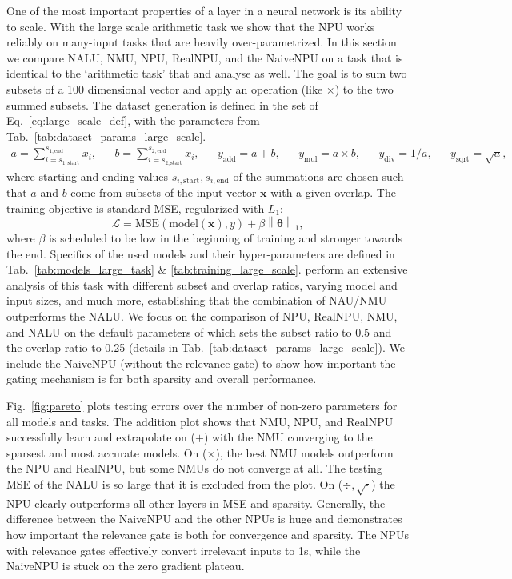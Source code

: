 \documentclass[9pt]{article}
\newcommand{\norm}[1]{\left\lVert #1 \right\rVert}
\begin{document}
One of the most important properties of a layer in a neural network is its
ability to scale. With the large scale arithmetic task we show that the NPU
works reliably on many-input tasks that are heavily over-parametrized.  In this
section we compare NALU, NMU, NPU, RealNPU, and the NaiveNPU on a task that is identical
to the `arithmetic task' that \cite{madsen_neural_2020} and
\cite{trask_neural_2018} analyse as well.
The goal is to sum two subsets of a 100 dimensional vector and
apply an operation (like $\times$) to the two summed subsets.  The dataset
generation is defined in the set of Eq.~\ref{eq:large_scale_def}, with the
parameters from Tab.~\ref{tab:dataset_params_large_scale}.
\begin{align}
  \label{eq:large_scale_def}
  a = \sum_{i=s_{1,\text{start}}}^{s_{1,\text{end}}} x_i, &&
  b = \sum_{i=s_{2,\text{start}}}^{s_{2,\text{end}}} x_i, &&
  y_{\text{add}} = a + b, && y_{\text{mul}} = a \times b, &&
  y_{\text{div}} = 1 / a, && y_{\text{sqrt}} = \sqrt{a},
\end{align}
where starting and ending values $s_{i,\text{start}},s_{i,\text{end}}$ of the
summations are chosen such that $a$ and $b$ come from subsets of the input
vector $\bm x$ with a given overlap.  The training objective is standard MSE,
regularized with $L_1$:
\begin{equation}
  \mathcal{L} = \text{MSE}(\text{model}(\bm x), y) + \beta\norm{\bm\theta}_1,
\end{equation}
where $\beta$ is scheduled to be low in the beginning of training and stronger
towards the end.  Specifics of the used models and their hyper-parameters are defined in
Tab.~\ref{tab:models_large_task} \& \ref{tab:training_large_scale}.  \cite{madsen_neural_2020} perform an
extensive analysis of this task with different subset and overlap ratios,
varying model and input sizes, and much more, establishing that the combination
of NAU/NMU outperforms the NALU. We focus on the
comparison of NPU, RealNPU, NMU, and NALU on the default parameters of
\cite{madsen_neural_2020} which sets the subset ratio to 0.5 and the overlap
ratio to 0.25 (details in Tab.~\ref{tab:dataset_params_large_scale}).
We include the NaiveNPU (without the relevance gate) to show
how important the gating mechanism is for both sparsity and overall
performance.

Fig.~\ref{fig:pareto} plots testing errors over the number of non-zero
parameters for all models and tasks.  The addition plot shows that NMU, NPU,
and RealNPU successfully learn and extrapolate on ($+$) with the NMU converging
to the sparsest and most accurate models.
On ($\times$), the best NMU models outperform the NPU and RealNPU, but some
NMUs do not converge at all. The testing MSE of the NALU is so large that it is
excluded from the plot.
On ($\div,\sqrt{\cdot}$) the NPU clearly outperforms all other layers
in MSE and sparsity. Generally, the difference between the NaiveNPU and the other NPUs
is huge and demonstrates how important the relevance gate is both
for convergence and sparsity. The NPUs with relevance gates effectively convert
irrelevant inputs to 1s, while the NaiveNPU is stuck on the zero gradient
plateau.
\end{document}
